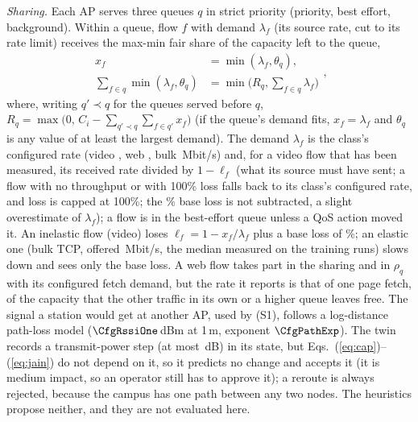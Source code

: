 \documentclass[conference]{IEEEtran}
\begin{document}
\emph{Sharing.} Each AP serves three queues $q$ in strict priority (priority, best effort, background). Within a queue, flow $f$ with demand $\lambda_f$ (its source rate, cut to its rate limit) receives the max-min fair share of the capacity left to the queue,
\begin{equation}
\boxed{\begin{aligned}
x_f&=\min(\lambda_f,\theta_q),\\
\textstyle\sum_{f\in q}\min(\lambda_f,\theta_q)&=\min\big(R_q,\textstyle\sum_{f\in q}\lambda_f\big)
\end{aligned}},
\label{eq:share}
\end{equation}
where, writing $q'\prec q$ for the queues served before $q$, $R_q=\max\big(0,\,C_i-\sum_{q'\prec q}\sum_{f\in q'}x_f\big)$ (if the queue's demand fits, $x_f=\lambda_f$ and $\theta_q$ is any value of at least the largest demand). The demand $\lambda_f$ is the class's configured rate (video \CfgVideo, web \CfgWebRate, bulk \CfgBulk\,Mbit/s) and, for a video flow that has been measured, its received rate divided by $1-\ell_f$ (what its source must have sent; a flow with no throughput or with 100\% loss falls back to its class's configured rate, and loss is capped at 100\%; the \CfgBaseLoss\% base loss is not subtracted, a slight overestimate of $\lambda_f$); a flow is in the best-effort queue unless a QoS action moved it. An inelastic flow (video) loses $\ell_f=1-x_f/\lambda_f$ plus a base loss of \CfgBaseLoss\%; an elastic one (bulk TCP, offered \CfgBulk\,Mbit/s, the median measured on the training runs) slows down and sees only the base loss. A web flow takes part in the sharing and in $\rho_q$ with its configured fetch demand, but the rate it reports is that of one page fetch, \CfgFetch{} of the capacity that the other traffic in its own or a higher queue leaves free. The signal a station would get at another AP, used by (S1), follows a log-distance path-loss model ($\CfgRssiOne$\,dBm at 1\,m, exponent $\CfgPathExp$). The twin records a transmit-power step (at most \CfgTxStep\,dB) in its state, but Eqs.~(\ref{eq:cap})--(\ref{eq:jain}) do not depend on it, so it predicts no change and accepts it (it is medium impact, so an operator still has to approve it); a reroute is always rejected, because the campus has one path between any two nodes. The heuristics propose neither, and they are not evaluated here.
\end{document}
